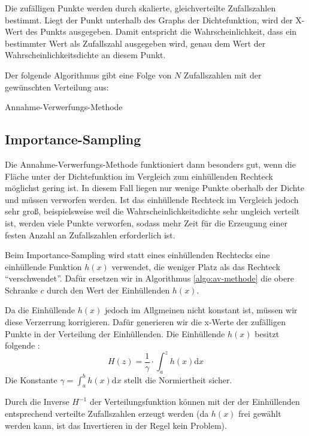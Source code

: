 Die zufälligen Punkte werden durch skalierte, gleichverteilte Zufallszahlen
bestimmt. Liegt der Punkt unterhalb des Graphs der Dichtefunktion, wird der
X-Wert des Punkts ausgegeben. Damit entspricht die Wahrscheinlichkeit, dass ein
bestimmter Wert als Zufallszahl ausgegeben wird, genau dem Wert der
Wahrscheinlichkeitsdichte an diesem Punkt.

Der folgende Algorithmus gibt eine Folge von $N$ Zufallszahlen mit der gewünschten
Verteilung aus:

\begin{algorithm}[h!]


\caption{Annahme-Verwerfungs-Methode}\label{algo:av-methode}
\end{algorithm}

\subsection{Importance-Sampling}

Die Annahme-Verwerfungs-Methode funktioniert dann besonders gut, wenn die Fläche
unter der Dichtefunktion im Vergleich zum einhüllenden Rechteck möglichst gering
ist. In diesem Fall liegen nur wenige Punkte oberhalb der Dichte und müssen
verworfen werden. Ist das einhüllende Rechteck im Vergleich jedoch sehr groß,
beispielsweise weil die Wahrscheinlichkeitsdichte sehr ungleich verteilt ist,
werden viele Punkte verworfen, sodass mehr Zeit für die Erzeugung einer festen
Anzahl an Zufallszahlen erforderlich ist.

Beim Importance-Sampling wird statt eines einhüllenden Rechtecks eine einhüllende
Funktion $h(x)$ verwendet, die weniger Platz als das Rechteck "`verschwendet"'.
Dafür ersetzen wir in Algorithmus \ref{algo:av-methode} die obere Schranke $c$
durch den Wert der Einhüllenden $h(x)$.

Da die Einhüllende $h(x)$ jedoch im Allgmeinen nicht konstant ist, müssen wir
diese Verzerrung korrigieren. Dafür generieren wir die x-Werte der zufälligen
Punkte in der Verteilung der Einhüllenden. Die Einhüllende $h(x)$ besitzt
folgende :
\[H(z) = \frac{1}{\gamma}\cdot\int_a^z h(x) \mathrm{d}x\]
Die Konstante $\gamma = \int_a^b h(x)\mathrm{d}x$ stellt die Normiertheit sicher.

Durch die Inverse $H^{-1}$ der Verteilungsfunktion können mit der
 der Einhüllenden entsprechend
verteilte Zufallszahlen erzeugt werden (da $h(x)$ frei gewählt werden kann, ist
das Invertieren in der Regel kein Problem).

